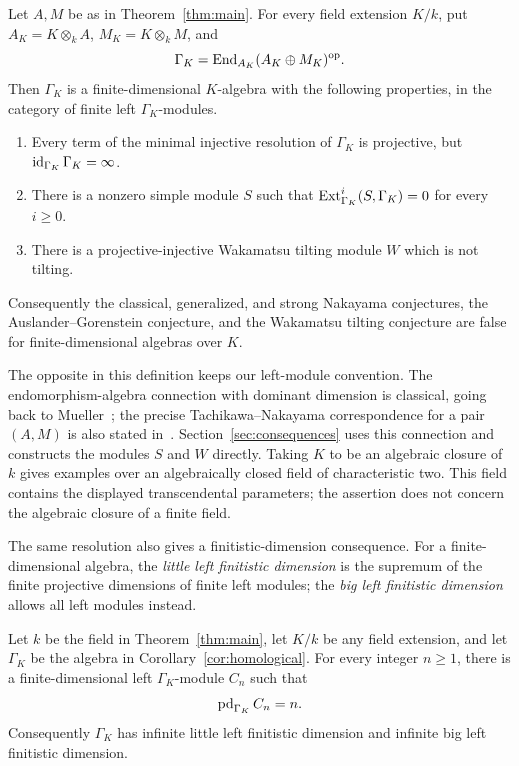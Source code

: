 \begin{corollary}\label{cor:homological}
Let $A,M$ be as in Theorem~\ref{thm:main}. For every field extension
$K/k$, put $A_K=K\otimes_k A$, $M_K=K\otimes_k M$, and
\[
 \Gamma_K=\operatorname{End}_{A_K}(A_K\oplus M_K)^{\mathrm{op}}.
\]
Then $\Gamma_K$ is a finite-dimensional $K$-algebra with the following
properties, in the category of finite left $\Gamma_K$-modules.
\begin{enumerate}
\item Every term of the minimal injective resolution of $\Gamma_K$
is projective, but $\operatorname{id}_{\Gamma_K}\Gamma_K=\infty$.
\item There is a nonzero simple module $S$ such that
$\operatorname{Ext}_{\Gamma_K}^i(S,\Gamma_K)=0$ for every $i\geq0$.
\item There is a projective-injective Wakamatsu tilting module $W$
which is not tilting.
\end{enumerate}
Consequently the classical, generalized, and strong Nakayama conjectures,
the Auslander--Gorenstein conjecture, and the Wakamatsu tilting conjecture
are false for finite-dimensional algebras over $K$.
\end{corollary}

The opposite in this definition keeps our left-module convention. The
endomorphism-algebra connection with dominant dimension is classical,
going back to Mueller~\cite[Lemma~3 and Theorem~4]{Mueller1968}; the precise
Tachikawa--Nakayama correspondence for a pair $(A,M)$ is also stated
in~\cite[p.~7288]{ChenXi2025TAMS}. Section~\ref{sec:consequences}
uses this connection and constructs the modules $S$ and $W$ directly.
Taking $K$ to be an algebraic closure of $k$ gives examples over an
algebraically closed field of characteristic two. This field contains
the displayed transcendental parameters; the assertion does not concern
the algebraic closure of a finite field.

The same resolution also gives a finitistic-dimension consequence.
For a finite-dimensional algebra, the \emph{little left finitistic
dimension} is the supremum of the finite projective dimensions of
finite left modules; the \emph{big left finitistic dimension} allows
all left modules instead.

\begin{corollary}\label{cor:finitistic}
Let $k$ be the field in Theorem~\ref{thm:main}, let $K/k$ be any field
extension, and let $\Gamma_K$ be the algebra in
Corollary~\ref{cor:homological}. For every integer $n\geq1$, there is a
finite-dimensional left $\Gamma_K$-module $C_n$ such that
\[
 \operatorname{pd}_{\Gamma_K}C_n=n.
\]
Consequently $\Gamma_K$ has infinite little left finitistic dimension
and infinite big left finitistic dimension.
\end{corollary}

